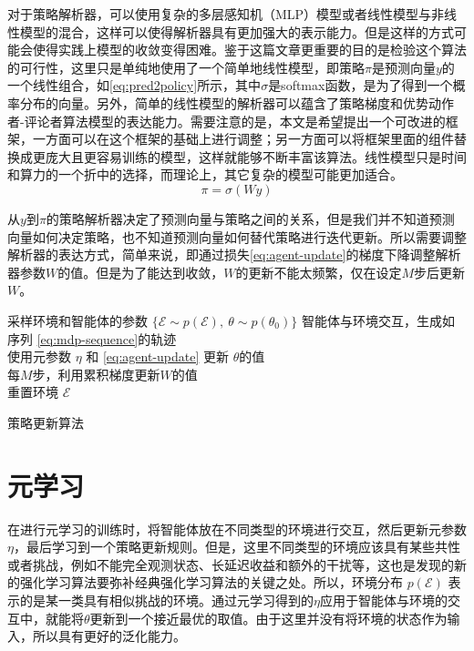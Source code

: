 对于策略解析器，可以使用复杂的多层感知机（MLP）模型或者线性模型与非线性模型的混合，这样可以使得解析器具有更加强大的表示能力。但是这样的方式可能会使得实践上模型的收敛变得困难。鉴于这篇文章更重要的目的是检验这个算法的可行性，这里只是单纯地使用了一个简单地线性模型，即策略$\pi$是预测向量$y$的一个线性组合，如\autoref{eq:pred2policy}所示，其中$\sigma$是softmax函数，是为了得到一个概率分布的向量。另外，简单的线性模型的解析器可以蕴含了策略梯度和优势动作者-评论者算法模型的表达能力。需要注意的是，本文是希望提出一个可改进的框架，一方面可以在这个框架的基础上进行调整；另一方面可以将框架里面的组件替换成更庞大且更容易训练的模型，这样就能够不断丰富该算法。线性模型只是时间和算力的一个折中的选择，而理论上，其它复杂的模型可能更加适合。
\begin{equation}
    \pi = \sigma (Wy)
    \label{eq:pred2policy}
\end{equation}

从$y$到$\pi$的策略解析器决定了预测向量与策略之间的关系，但是我们并不知道预测向量如何决定策略，也不知道预测向量如何替代策略进行迭代更新。所以需要调整解析器的表达方式，简单来说，即通过损失\autoref{eq:agent-update}的梯度下降调整解析器参数$W$的值。但是为了能达到收敛，$W$的更新不能太频繁，仅在设定$M$步后更新$W$。

\begin{algorithm}[h]
    采样环境和智能体的参数 $\{ \mathcal{E} \sim p(\mathcal{E}), \ \theta \sim p(\theta_0)\}$
     {
        智能体与环境交互，生成如序列 \ref{eq:mdp-sequence}的轨迹 \\
        使用元参数 $\eta$ 和 \autoref{eq:agent-update} 更新 $\theta$的值 \\
        每$M$步，利用累积梯度更新$W$的值\\
         {
            重置环境 $\mathcal{E}$
        }
    }
    \caption{策略更新算法}
    \label{algo:policy-update}
\end{algorithm}



\section{元学习}

在进行元学习的训练时，将智能体放在不同类型的环境进行交互，然后更新元参数$\eta$，最后学习到一个策略更新规则。但是，这里不同类型的环境应该具有某些共性或者挑战，例如不能完全观测状态、长延迟收益和额外的干扰等，这也是发现的新的强化学习算法要弥补经典强化学习算法的关键之处。所以，环境分布 $p(\mathcal{E})$ 表示的是某一类具有相似挑战的环境。通过元学习得到的$\eta$应用于智能体与环境的交互中，就能将$\theta$更新到一个接近最优的取值。由于这里并没有将环境的状态作为输入，所以具有更好的泛化能力。

